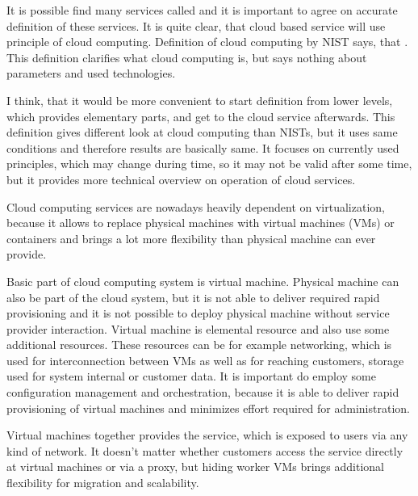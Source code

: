 
It is possible find many services called  and it is important to agree on accurate definition of these services. It is quite clear, that cloud based service will use principle of cloud computing. Definition of cloud computing by \Ac{NIST} says, that  \cite{cloud-definition}. This definition clarifies what cloud computing is, but says nothing about parameters and used technologies.

I think, that it would be more convenient to start definition from lower levels, which provides elementary parts, and get to the cloud service afterwards. This definition gives different look at cloud computing than \Ac{NIST}s, but it uses same conditions and therefore results are basically same. It focuses on currently used principles, which may change during time, so it may not be valid after some time, but it provides more technical overview on operation of cloud services.


Cloud computing services are nowadays heavily dependent on virtualization, because it allows to replace physical machines with virtual machines (\Ac{VM}s) or containers and brings a lot more flexibility than physical machine can ever provide.

Basic part of cloud computing system is virtual machine. Physical machine can also be part of the cloud system, but it is not able to deliver required rapid provisioning and it is not possible to deploy physical machine without service provider interaction. Virtual machine is elemental resource and also use some additional resources. These resources can be for example networking, which is used for interconnection between \Ac{VM}s as well as for reaching customers, storage used for system internal or customer data. It is important do employ some configuration management and orchestration, because it is able to deliver rapid provisioning of virtual machines and minimizes effort required for administration.

Virtual machines together provides the service, which is exposed to users via any kind of network. It doesn't matter whether customers access the service directly at virtual machines or via a proxy, but hiding worker \Ac{VM}s brings additional flexibility for migration and scalability. 

